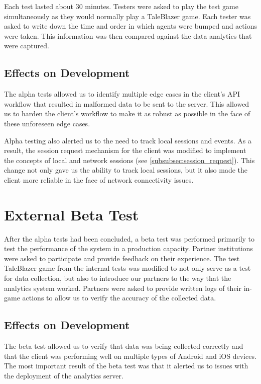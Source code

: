 Each test lasted about 30 minutes. Testers were asked to play the test game simultaneously as they would normally play a TaleBlazer game. Each tester was asked to write down the time and order in which agents were bumped and actions were taken. This information was then compared against the data analytics that were captured. 

\subsection{Effects on Development}

The alpha tests allowed us to identify multiple edge cases in the client's API workflow that resulted in malformed data to be sent to the server. This allowed us to harden the client's workflow to make it as robust as possible in the face of these unforeseen edge cases. 

Alpha testing also alerted us to the need to track local sessions and events. As a result, the session request mechanism for the client was modified to implement the concepts of local and network sessions (see \ref{subsubsec:session_request}). This change not only gave us the ability to track local sessions, but it also made the client more reliable in the face of network connectivity issues. 

\section{External Beta Test}

After the alpha tests had been concluded, a beta test was performed primarily to test the performance of the system in a production capacity. Partner institutions were asked to participate and provide feedback on their experience. The test TaleBlazer game from the internal tests was modified to not only serve as a test for data collection, but also to introduce our partners to the way that the analytics system worked. Partners were asked to provide written logs of their in-game actions to allow us to verify the accuracy of the collected data.

\subsection{Effects on Development}

The beta test allowed us to verify that data was being collected correctly and that the client was performing well on multiple types of Android and iOS devices. The most important result of the beta test was that it alerted us to issues with the deployment of the analytics server.

